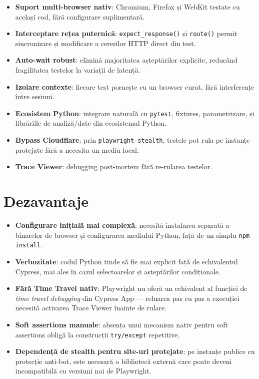 \begin{itemize}
    \item \textbf{Suport multi-browser nativ}: Chromium, Firefox și WebKit testate cu același cod,
          fără configurare suplimentară.
    \item \textbf{Interceptare rețea puternică}: \texttt{expect\_response()} și
          \texttt{route()} permit sincronizare și modificare a cererilor HTTP direct din test.
    \item \textbf{Auto-wait robust}: elimină majoritatea așteptărilor explicite, reducând
          fragilitatea testelor la variații de latență.
    \item \textbf{Izolare contexte}: fiecare test pornește cu un browser curat, fără interferențe
          între sesiuni.
    \item \textbf{Ecosistem Python}: integrare naturală cu \texttt{pytest}, fixtures,
          parametrizare, și librăriile de analiză/date din ecosistemul Python.
    \item \textbf{Bypass Cloudflare}: prin \texttt{playwright-stealth}, testele pot rula
          pe instanțe protejate fără a necesita un mediu local.
    \item \textbf{Trace Viewer}: debugging post-mortem fără re-rularea testelor.
\end{itemize}

\section{Dezavantaje}

\begin{itemize}
    \item \textbf{Configurare inițială mai complexă}: necesită instalarea separată a binarelor
          de browser și configurarea mediului Python, față de un simplu \texttt{npm install}.
    \item \textbf{Verbozitate}: codul Python tinde să fie mai explicit față de echivalentul
          Cypress, mai ales în cazul selectoarelor și așteptărilor condiționale.
    \item \textbf{Fără Time Travel nativ}: Playwright nu oferă un echivalent al funcției
          de \textit{time travel debugging} din Cypress App --- reluarea pas cu pas a
          execuției necesită activarea Trace Viewer înainte de rulare.
    \item \textbf{Soft assertions manuale}: absența unui mecanism nativ pentru soft assertions
          obligă la construcții \texttt{try/except} repetitive.
    \item \textbf{Dependență de stealth pentru site-uri protejate}: pe instanțe publice
          cu protecție anti-bot, este necesară o bibliotecă externă care poate deveni
          incompatibilă cu versiuni noi de Playwright.
\end{itemize}
